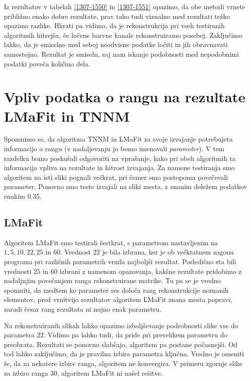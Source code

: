 \FloatBarrier

Iz rezultatov v  tabelah \ref{1307-1550} in \ref{1307-1551} opazimo, da obe metodi vrnete približno enako dobre rezultate, 
prav tako tudi vizualno med rezultati težko opazimo razlike.
Hkrati pa vidimo, da je rekonstrukcija pri vseh testiranih algoritmih hitrejša, če ločene barvne kanale rekonstruiramo posebej.  Zaključimo lahko, da je smiselno med seboj neodvisne podatke ločiti in jih obravnavati samostojno. Rezultat je smiseln, saj nam iskanje podobnosti med nepodobnimi podatki poveča količino dela.

\section{Vpliv podatka o rangu na rezultate LMaFit in TNNM} \label{1307-2253}
Spomnimo se, da algoritma TNNM in LMaFit za svoje izvajanje potrebujeta informacijo o rangu (v nadaljevanju jo bomo imenovali \textit{parameter}). V tem razdelku bomo poskušali odgovoriti na vprašanje, kako pri obeh algoritmih ta informacija vpliva na rezultate in hitrost izvajanja. Za namene testiranja smo algoritem na isti sliki pognali večkrat, pri čemer smo postopoma povečevali parameter. Ponovno smo teste izvajali na sliki mesta, z znanim deležem podatkov enakim 0.35.

\subsection{LMaFit}
Algoritem LMaFit smo testirali šestkrat, s parametrom nastavljenim na
$1, 5, 10, 22, 25$ in $60$. Vrednost $22$ je bila izbrana, ker je ob večkratnem zagonu programa pri različnih parametrih vrnila najboljši rezultat. Posledično sta bili vrednosti $25$ in $60$ izbrani z namenom opazovanja, kakšne rezultate pridobimo z nadaljnjim povečanjem ranga rekonstruirane matrike. Tu pa se je vredno spomniti, da medtem ko parameter res določa rang rekonstrukcije neznanih elementov, pred vrnitvijo rezultatov algoritem LMaFit znana mesta popravi, zaradi česar rang rezultata ni nujno enak parametru.

\FloatBarrier
Na rekonstruiranih slikah lahko opazimo izboljševanje podrobnosti slike vse do parametra $22$. Vidimo pa lahko tudi, da pride pri prevelikem parametru do preobrata. Rezultati se ponovno slabšajo, algoritem pa postane počasnejši. Od tod lahko zaključimo, da je pravilna izbira parametra ključna. Vredno je omeniti še, da za nekatere izbire ranga, algoritem ne konvergira. V primeru zgornje slike za izbiro ranga $30$, algoritem LMaFit ni našel rešitve.

